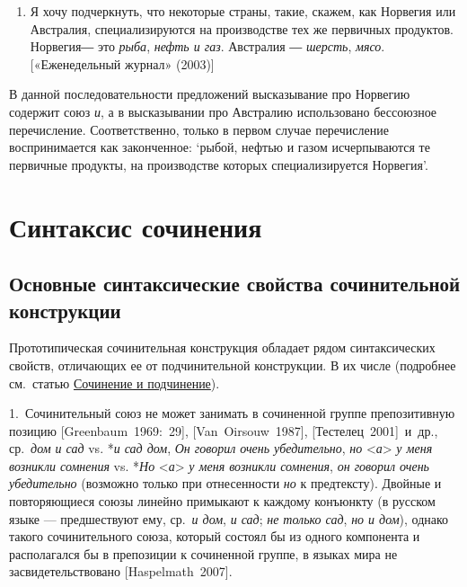 \begin{enumerate}
  \def\labelenumi{(\arabic{enumi})}
  \setcounter{enumi}{65}
  \item
        Я хочу подчеркнуть, что некоторые страны, такие, скажем, как Норвегия
        или Австралия, специализируются на производстве тех же первичных
        продуктов. Норвегия― это \textit{рыба}, \textit{нефть и газ}. Австралия ―
        \textit{шерсть}, \textit{мясо}. {[}«Еженедельный журнал» (2003){]}
\end{enumerate}

В данной последовательности предложений высказывание про Норвегию
содержит союз \textit{и}, а в высказывании про Австралию использовано
бессоюзное перечисление. Соответственно, только в первом случае
перечисление воспринимается как законченное: `рыбой, нефтью и газом
исчерпываются те первичные продукты, на производстве которых
специализируется Норвегия'.

\section{Синтаксис
  сочинения}\label{ux441ux438ux43dux442ux430ux43aux441ux438ux441-ux441ux43eux447ux438ux43dux435ux43dux438ux44f}

\subsection{Основные синтаксические свойства сочинительной
  конструкции}\label{ux43eux441ux43dux43eux432ux43dux44bux435-ux441ux438ux43dux442ux430ux43aux441ux438ux447ux435ux441ux43aux438ux435-ux441ux432ux43eux439ux441ux442ux432ux430-ux441ux43eux447ux438ux43dux438ux442ux435ux43bux44cux43dux43eux439-ux43aux43eux43dux441ux442ux440ux443ux43aux446ux438ux438}

Прототипическая сочинительная конструкция обладает рядом синтаксических
свойств, отличающих ее от подчинительной конструкции. В их числе
(подробнее см.~статью \underline{Сочинение и подчинение}).

1.~Сочинительный союз не может занимать в сочиненной группе
препозитивную позицию {[}Greenbaum~1969:~29{]}, {[}Van~Oirsouw~1987{]},
{[}Тестелец~2001{]}~и~др., ср.~\textit{дом и сад} vs. *\textit{и сад дом},
\textit{Он говорил очень убедительно}, \textit{но}
\textless{}\textit{а}\textgreater{} \textit{у меня возникли сомнения} vs.
*\textit{Но} \textless{}\textit{а}\textgreater{} \textit{у меня возникли
  сомнения}, \textit{он говорил очень убедительно} (возможно только при
отнесенности \textit{но} к предтексту). Двойные и повторяющиеся союзы
линейно примыкают к каждому конъюнкту (в русском языке --- предшествуют
ему, ср.~\textit{и дом}, \textit{и сад}; \textit{не только сад}, \textit{но и
  дом}), однако такого сочинительного союза, который состоял бы из одного
компонента и располагался бы в препозиции к сочиненной группе, в языках
мира не засвидетельствовано {[}Haspelmath~2007{]}.

